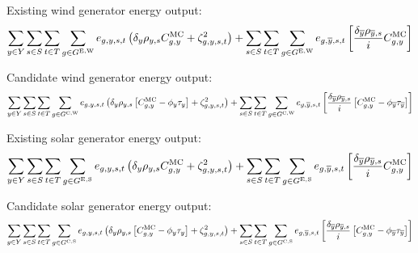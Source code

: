 \documentclass{article}
\newcommand{\sGeneratorsExistingWind}{G^{\mathrm{E,W}}}
\newcommand{\sGeneratorsExistingSolar}{G^{\mathrm{E,S}}}
\newcommand{\sGeneratorsCandidateWind}{G^{\mathrm{C,W}}}
\newcommand{\sGeneratorsCandidateSolar}{G^{\mathrm{C,S}}}
\newcommand{\sScenarios}{S}
\newcommand{\sIntervals}{T}
\newcommand{\iGenerator}{g}
\newcommand{\iYear}{y}
\newcommand{\iYearTerminal}{\overline{\iYear}}
\newcommand{\iScenario}{s}
\newcommand{\iInterval}{t}
\newcommand{\cScenarioDuration}[1][\iYear,\iScenario]{\rho_{#1}}
\newcommand{\cMarginalCost}[1][\iGenerator,\iYear]{C^{\mathrm{MC}}_{#1}}
\newcommand{\cInterestRate}{i}
\newcommand{\cDiscountRate}[1][\iYear]{\delta_{#1}}
\newcommand{\vBaseline}[1][\iYear]{\phi_{#1}}
\newcommand{\vPermitPrice}[1][\iYear]{\tau_{#1}}
\newcommand{\vEnergy}[1][\iGenerator,\iYear,\iScenario,\iInterval]{e_{#1}}
\newcommand{\dGeneratorEnergyOutput}[1][\iGenerator,\iYear,\iScenario,\iInterval]{\zeta_{#1}^{2}}
\begin{document}
Existing wind generator energy output:
\begin{equation}
	\sumIntervals \sum\limits_{\iGenerator \in \sGeneratorsExistingWind} \vEnergy \left(\cDiscountRate\cScenarioDuration \cMarginalCost + \dGeneratorEnergyOutput \right) + \sum\limits_{\iScenario \in \sScenarios} \sum\limits_{\iInterval \in \sIntervals} \sum\limits_{\iGenerator \in \sGeneratorsExistingWind} \vEnergy[\iGenerator,\iYearTerminal,\iScenario,\iInterval] \left[ \frac{\cDiscountRate[\iYearTerminal] \cScenarioDuration[\iYearTerminal,\iScenario]}{\cInterestRate} \cMarginalCost \right]
\end{equation}

Candidate wind generator energy output:
\begin{equation}
	\sumIntervals \sum\limits_{\iGenerator \in \sGeneratorsCandidateWind} \vEnergy \left(\cDiscountRate\cScenarioDuration \left[\cMarginalCost - \vBaseline\vPermitPrice \right] + \dGeneratorEnergyOutput \right) + \sum\limits_{\iScenario \in \sScenarios} \sum\limits_{\iInterval \in \sIntervals} \sum\limits_{\iGenerator \in \sGeneratorsCandidateWind} \vEnergy[\iGenerator,\iYearTerminal,\iScenario,\iInterval] \left[ \frac{\cDiscountRate[\iYearTerminal] \cScenarioDuration[\iYearTerminal,\iScenario]}{\cInterestRate} \left[\cMarginalCost - \vBaseline[\iYearTerminal] \vPermitPrice[\iYearTerminal] \right] \right]
\end{equation}

Existing solar generator energy output:
\begin{equation}
	\sumIntervals \sum\limits_{\iGenerator \in \sGeneratorsExistingSolar} \vEnergy \left(\cDiscountRate\cScenarioDuration \cMarginalCost + \dGeneratorEnergyOutput \right) + \sum\limits_{\iScenario \in \sScenarios} \sum\limits_{\iInterval \in \sIntervals} \sum\limits_{\iGenerator \in \sGeneratorsExistingSolar} \vEnergy[\iGenerator,\iYearTerminal,\iScenario,\iInterval] \left[ \frac{\cDiscountRate[\iYearTerminal] \cScenarioDuration[\iYearTerminal,\iScenario]}{\cInterestRate} \cMarginalCost \right]
\end{equation}

Candidate solar generator energy output:
\begin{equation}
	\sumIntervals \sum\limits_{\iGenerator \in \sGeneratorsCandidateSolar} \vEnergy \left(\cDiscountRate\cScenarioDuration \left[\cMarginalCost - \vBaseline\vPermitPrice \right] + \dGeneratorEnergyOutput \right) + \sum\limits_{\iScenario \in \sScenarios} \sum\limits_{\iInterval \in \sIntervals} \sum\limits_{\iGenerator \in \sGeneratorsCandidateSolar} \vEnergy[\iGenerator,\iYearTerminal,\iScenario,\iInterval] \left[ \frac{\cDiscountRate[\iYearTerminal] \cScenarioDuration[\iYearTerminal,\iScenario]}{\cInterestRate} \left[\cMarginalCost - \vBaseline[\iYearTerminal] \vPermitPrice[\iYearTerminal] \right] \right]
\end{equation}
\end{document}

